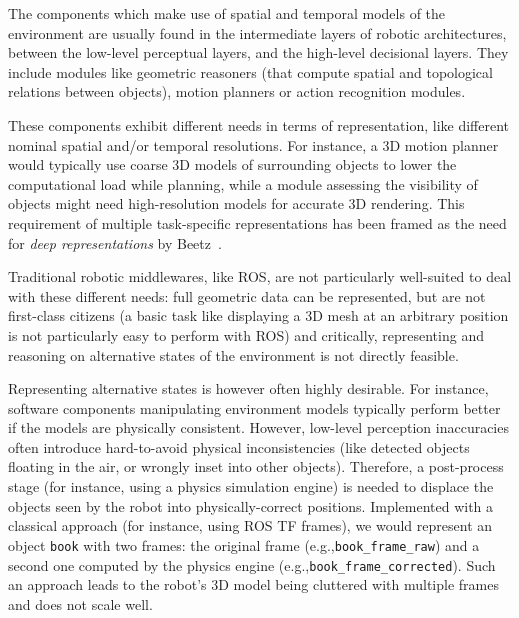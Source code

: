 \documentclass[conference]{IEEEtran}
\newcommand{\eg}{e.g.,\xspace}
\begin{document}
The components which make use of spatial and temporal models of the environment
are usually found in the intermediate layers of robotic architectures, between
the low-level perceptual layers, and the high-level decisional layers. They
include modules like geometric reasoners (that compute spatial and topological
relations between objects), motion planners or action recognition modules.

These components exhibit different needs in terms of representation,
like different nominal spatial and/or temporal resolutions. For instance, a 3D
motion planner would typically use coarse 3D models of surrounding objects to
lower the computational load while planning, while a module assessing the
visibility of objects might need high-resolution models 
for accurate 3D rendering. This requirement of multiple
task-specific representations has been framed as the need for \emph{deep
representations} by Beetz~\cite{beetz2010towards}.


Traditional robotic middlewares, like ROS, are not particularly well-suited to
deal with these different needs: full geometric data can be represented, but are
not first-class citizens (a basic task like displaying a 3D mesh at an arbitrary
position is not particularly easy to perform with ROS) and critically,
representing and reasoning on alternative states of the environment is not
directly feasible.

Representing alternative states is however often highly desirable. For instance,
software components manipulating environment models typically perform better if
the models are physically consistent. However, low-level perception inaccuracies
often introduce hard-to-avoid physical inconsistencies (like detected objects
floating in the air, or wrongly inset into other objects).
Therefore, a post-process stage (for instance, using a physics simulation
engine) is needed to displace the objects seen by the robot into
physically-correct positions. Implemented with a classical approach (for
instance, using ROS TF frames), we would represent an object {\tt book} with two
frames: the original frame (\eg {\tt book\_frame\_raw}) and a second one
computed by the physics engine (\eg {\tt book\_frame\_corrected}). Such an
approach leads to the robot's 3D model being cluttered with multiple frames and
does not scale well.
\end{document}
